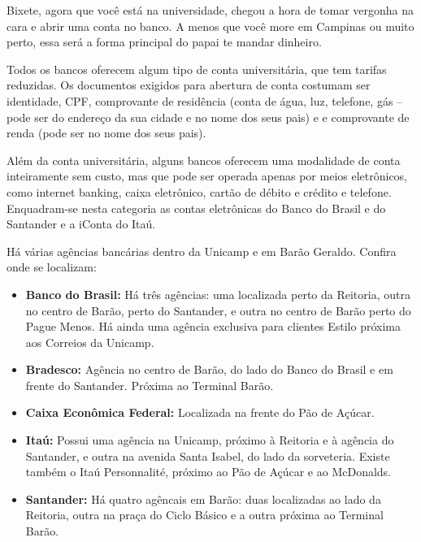 Bixete, agora que você está na universidade, chegou a hora de tomar vergonha na
cara e abrir uma conta no banco. A menos que você more em Campinas ou muito
perto, essa será a forma principal do papai te mandar dinheiro.

Todos os bancos oferecem algum tipo de conta universitária, que tem tarifas
reduzidas. Os documentos exigidos para abertura de conta costumam ser
identidade, CPF, comprovante de residência (conta de água, luz, telefone, gás
-- pode ser do endereço da sua cidade e no nome dos seus pais) e e comprovante
de renda (pode ser no nome dos seus pais).

Além da conta universitária, alguns bancos oferecem uma modalidade de conta
inteiramente sem custo, mas que pode ser operada apenas por meios eletrônicos,
como internet banking, caixa eletrônico, cartão de débito e crédito e telefone.
Enquadram-se nesta categoria as contas eletrônicas do Banco do Brasil e do
Santander e a iConta do Itaú.

Há várias agências bancárias dentro da Unicamp e em Barão Geraldo. Confira onde
se localizam:

\begin{itemize}
    \item \textbf{Banco do Brasil:} Há três agências: uma localizada perto da
        Reitoria, outra no centro de Barão, perto do Santander, e outra no
        centro de Barão perto do Pague Menos. Há ainda uma agência exclusiva
        para clientes Estilo próxima aos Correios da Unicamp.

    \item \textbf{Bradesco:} Agência no centro de Barão, do lado do Banco do
        Brasil e em frente do Santander. Próxima ao Terminal Barão.

    \item \textbf{Caixa Econômica Federal:} Localizada na frente do Pão de
        Açúcar.

    \item \textbf{Itaú:} Possui uma agência na Unicamp, próximo à Reitoria e à
        agência do Santander, e outra na avenida Santa Isabel, do lado da
        sorveteria. Existe também o Itaú Personnalité, próximo ao Pão de Açúcar
        e ao McDonalds.

    \item \textbf{Santander:} Há quatro agêncais em Barão: duas localizadas ao
        lado da Reitoria, outra na praça do Ciclo Básico e a outra próxima ao
        Terminal Barão.
\end{itemize}

